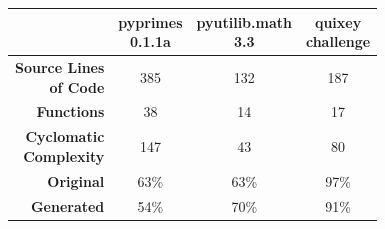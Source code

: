 \documentclass{icldt}
\numberwithin{equation}{section}       %
\begin{document}
{{\newcommand{\specialcell}[2][c]{%
  \begin{tabular}[#1]{@{}c@{}}#2\end{tabular}}
\begin{tabularx}{\textwidth}{ |r|c|c|c| }
	\hline
	& \specialcell{\textsf{pyprimes} \\ \textsf{0.1.1a}} & \specialcell{\textsf{pyutilib.math} \\ \textsf{3.3}} & \specialcell{\textsf{quixey} \\ \textsf{challenge}} \\
	\hline
	\specialcell{\textbf{Source Lines} \\ \textbf{of Code}} & 385 & 132 & 187 \\
	\hline
	\textbf{Functions} & 38 & 14 & 17 \\
	\hline
	\specialcell{\textbf{Cyclomatic} \\ \textbf{Complexity}} & 147 & 43 & 80 \\
	\hline
	\textbf{Original} & 63\% & 63\% & 97\% \\
	\hline	
	\textbf{Generated} & 54\% & 70\% & 91\% \\
	\hline
\end{tabularx}


}}
\end{document}
